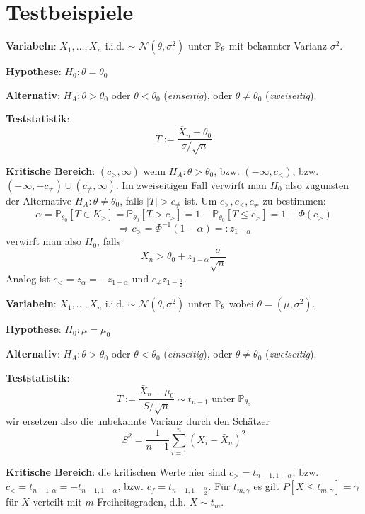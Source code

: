 \section*{Testbeispiele}

\textbf{Variabeln}: $X_1, \ldots , X_n$ i.i.d. $\sim$ $\mathcal{N}(\theta, \sigma^2)$ unter $\mathbb{P}_\theta$ mit bekannter Varianz $\sigma^2$.

\textbf{Hypothese}: $H_0 : \theta = \theta_0$

\textbf{Alternativ}: $H_A : \theta > \theta_0$ oder $\theta < \theta_0$ (\textit{einseitig}), oder $\theta \neq \theta_0$ (\textit{zweiseitig}).

\textbf{Teststatistik}: $$T := \frac{\overline{X}_n - \theta_0}{\sigma / \sqrt{n}}$$

\textbf{Kritische Bereich}: $(c_>, \infty)$ wenn $H_A : \theta > \theta_0$, bzw. $(-\infty, c_<)$, bzw. $(-\infty, -c_\neq) \cup (c_\neq, \infty)$. Im zweiseitigen Fall verwirft man $H_0$ also zugunsten der Alternative $H_A : \theta \neq \theta_0$, falls $|T| > c_\neq$ ist.
Um $c_>, c_<, c_\neq$ zu bestimmen:
$$\alpha=\mathbb{P}_{\theta_{0}}\left[T \in K_{>}\right]=\mathbb{P}_{\theta_{0}}\left[T>c_{>}\right]=1-\mathbb{P}_{\theta_{0}}\left[T \leq c_{>}\right]=1-\Phi\left(c_{>}\right)$$ $$\Rightarrow c_> = \Phi^{-1}(1- \alpha) =: z_{1 - \alpha}$$
verwirft man also $H_{0}$, falls
$$
\overline{X}_{n}>\theta_{0}+z_{1-\alpha} \frac{\sigma}{\sqrt{n}}
$$
Analog ist $c_< = z_\alpha = -z_{1-\alpha}$ und $c_\neq z_{1 - \frac{\alpha}{2}}$.


\textbf{Variabeln}: $X_1, \ldots , X_n$ i.i.d. $\sim$ $\mathcal{N}(\theta, \sigma^2)$ unter $\mathbb{P}_\theta$ wobei $\theta = (\mu, \sigma^2)$.

\textbf{Hypothese}: $H_0 : \mu = \mu_0$

\textbf{Alternativ}: $H_A : \theta > \theta_0$ oder $\theta < \theta_0$ (\textit{einseitig}), oder $\theta \neq \theta_0$ (\textit{zweiseitig}).

\textbf{Teststatistik}:
$$
T:=\frac{\bar{X}_{n}-\mu_{0}}{S / \sqrt{n}} \sim t_{n-1} \text { unter } \mathbb{P}_{\theta_{0}}
$$
wir ersetzen also die unbekannte Varianz durch den Schätzer
$$
S^{2}=\frac{1}{n-1} \sum_{i=1}^{n}\left(X_{i}-\bar{X}_{n}\right)^{2}
$$

\textbf{Kritische Bereich}: die kritischen Werte hier sind $c_{>}=t_{n-1,1-\alpha}$, bzw. $c_{<}=t_{n-1, \alpha}=-t_{n-1,1-\alpha}$, bzw. $c_{f}=t_{n-1,1-\frac{\alpha}{2}}$. Für $t_{m, \gamma}$ es gilt $P\left[X \leq t_{m, \gamma}\right]=\gamma$ für $X$-verteilt mit $m$ Freiheitsgraden, d.h. $X \sim t_{m}$.

